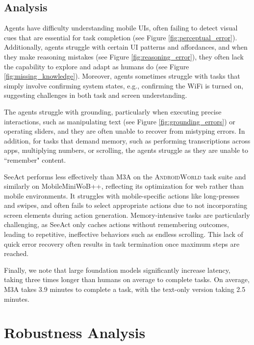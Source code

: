 \documentclass{article}
\newcommand{\system}{\textsc{AndroidWorld}\xspace}
\newcommand{\agent}{\textsc{M3A}\xspace}
\newcommand{\mobileminiwob}{MobileMiniWoB++\xspace}
\begin{document}
\subsection{Analysis}
\label{sec:experiment_analysis}

Agents have difficulty understanding mobile UIs, often failing to detect visual cues that are essential for task completion (see Figure \ref{fig:perceptual_error}). Additionally, agents struggle with certain UI patterns and affordances, and when they make reasoning mistakes (see Figure \ref{fig:reasoning_error}), they often lack the capability to explore and adapt as humans do (see Figure \ref{fig:missing_knowledge}). Moreover, agents sometimes struggle with tasks that simply involve confirming system states, e.g., confirming the WiFi is turned on, suggesting challenges in both task and screen understanding.

The agents struggle with grounding, particularly when executing precise interactions, such as manipulating text (see Figure \ref{fig:grounding_errors}) or operating sliders, and they are often unable to recover from mistyping errors. In addition, for tasks that demand memory, such as performing transcriptions across apps, multiplying numbers, or scrolling, the agents struggle as they are unable to ``remember" content.

SeeAct performs less effectively than \agent on the \system task suite and similarly on \mobileminiwob, reflecting its optimization for web rather than mobile environments. It struggles with mobile-specific actions like long-presses and swipes, and often fails to select appropriate actions due to not incorporating screen elements during action generation. Memory-intensive tasks are particularly challenging, as SeeAct only caches actions without remembering outcomes, leading to repetitive, ineffective behaviors such as endless scrolling. This lack of quick error recovery often results in task termination once maximum steps are reached.

Finally, we note that large foundation models significantly increase latency, taking three times longer than humans on average to complete tasks. On average, \agent takes 3.9 minutes to complete a task, with the text-only version taking 2.5 minutes.

\section{Robustness Analysis}
\label{sec:robustness}
\end{document}
